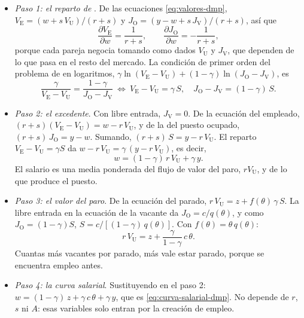 \documentclass[11pt]{article}
\begin{document}
\begin{itemize}
\item \emph{Paso 1: el reparto de }. De las ecuaciones \eqref{eq:valores-dmp}, $V_{\mathrm E}=(w+s\,V_{\mathrm U})/(r+s)$ y $J_{\mathrm O}=(y-w+s\,J_{\mathrm V})/(r+s)$, así que
  \begin{equation*}
  \frac{\partial V_{\mathrm E}}{\partial w}=\frac{1}{r+s},\qquad \frac{\partial J_{\mathrm O}}{\partial w}=-\frac{1}{r+s},
  \end{equation*}
  porque cada pareja negocia tomando como dados $V_{\mathrm U}$ y $J_{\mathrm V}$, que dependen de lo que pasa en el resto del mercado. La condición de primer orden del problema de  en logaritmos, $\gamma\ln(V_{\mathrm E}-V_{\mathrm U})+(1-\gamma)\ln(J_{\mathrm O}-J_{\mathrm V})$, es
  \begin{equation*}
  \frac{\gamma}{V_{\mathrm E}-V_{\mathrm U}}=\frac{1-\gamma}{J_{\mathrm O}-J_{\mathrm V}}\ \Longleftrightarrow\ V_{\mathrm E}-V_{\mathrm U}=\gamma\,S,\quad J_{\mathrm O}-J_{\mathrm V}=(1-\gamma)\,S.
  \end{equation*}
\item \emph{Paso 2: el excedente}. Con libre entrada, $J_{\mathrm V}=0$. De la ecuación del empleado, $(r+s)(V_{\mathrm E}-V_{\mathrm U})=w-r\,V_{\mathrm U}$, y de la del puesto ocupado, $(r+s)\,J_{\mathrm O}=y-w$. Sumando, $(r+s)\,S=y-r\,V_{\mathrm U}$. El reparto $V_{\mathrm E}-V_{\mathrm U}=\gamma S$ da $w-r\,V_{\mathrm U}=\gamma\,(y-r\,V_{\mathrm U})$, es decir,
  \begin{equation*}
  w=(1-\gamma)\,r\,V_{\mathrm U}+\gamma\,y.
  \end{equation*}
  El salario es una media ponderada del flujo de valor del paro, $rV_{\mathrm U}$, y de lo que produce el puesto.
\item \emph{Paso 3: el valor del paro}. De la ecuación del parado, $r\,V_{\mathrm U}=z+f(\theta)\,\gamma\,S$. La libre entrada en la ecuación de la vacante da $J_{\mathrm O}=c/q(\theta)$, y como $J_{\mathrm O}=(1-\gamma)S$, $S=c/[(1-\gamma)\,q(\theta)]$. Con $f(\theta)=\theta\,q(\theta)$:
  \begin{equation*}
  r\,V_{\mathrm U}=z+\frac{\gamma}{1-\gamma}\,c\,\theta.
  \end{equation*}
  Cuantas más vacantes por parado, más vale estar parado, porque se encuentra empleo antes.
\item \emph{Paso 4: la curva salarial}. Sustituyendo en el paso 2: $w=(1-\gamma)\,z+\gamma\,c\,\theta+\gamma\,y$, que es \eqref{eq:curva-salarial-dmp}. No depende de $r$, $s$ ni $A$: esas variables solo entran por la creación de empleo.

\end{itemize}
\end{document}
